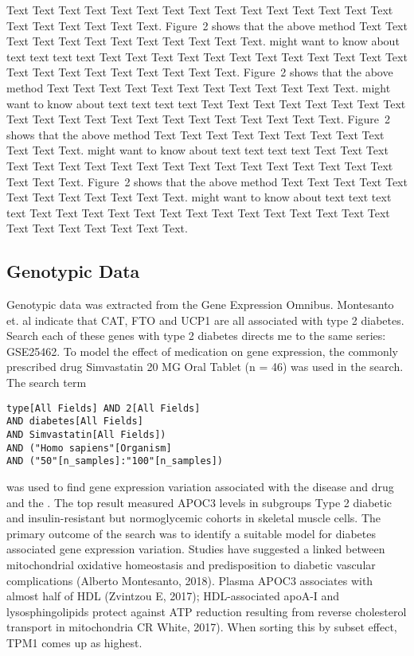 \documentclass{bioinfo}
\begin{document}
\begin{methods}
Text Text Text Text Text Text  Text Text Text Text Text Text Text
Text Text  Text Text Text Text Text Text.
Figure~2\vphantom{\ref{fig:02}} shows that the above method  Text
Text Text Text  Text Text Text Text Text Text  Text Text.
\citealp{Boffelli03} might want to know about  text text text text
Text Text Text Text Text Text Text Text Text Text Text Text Text
Text Text Text Text Text Text Text Text.
Figure~2\vphantom{\ref{fig:02}} shows that the above method  Text
Text Text Text Text Text Text Text Text Text  Text Text.
\citealp{Boffelli03} might want to know about text text text text
Text Text Text Text Text Text  Text Text Text Text Text Text Text
Text Text Text Text Text Text Text Text.
Figure~2\vphantom{\ref{fig:02}} shows that the above method  Text
Text Text Text Text Text Text Text Text Text  Text Text.
\citealp{Boffelli03} might want to know about text text text text
Text Text Text Text Text Text  Text Text Text Text Text Text Text
Text Text Text Text Text Text Text Text.
Figure~2\vphantom{\ref{fig:02}} shows that the above method Text
Text Text Text Text Text Text Text Text Text Text Text.
\citealp{Boffelli03} might want to know about text text text text
Text Text Text Text Text Text  Text Text Text Text Text Text Text
Text Text Text Text Text Text Text Text.
\subsection{Genotypic Data}

Genotypic data was extracted from the Gene Expression Omnibus. Montesanto et. al indicate that CAT, FTO and UCP1 are all associated with type 2 diabetes. Search each of these genes with type 2 diabetes directs me to the same series: GSE25462. To model the effect of medication on gene expression, the commonly prescribed drug Simvastatin 20 MG Oral Tablet (n = 46) was used in the search. The search term 


\begin{verbatim}
type[All Fields] AND 2[All Fields] 
AND diabetes[All Fields] 
AND Simvastatin[All Fields])
AND ("Homo sapiens"[Organism] 
AND ("50"[n_samples]:"100"[n_samples])

\end{verbatim}

was used to find gene expression variation associated with the disease and drug and the . The top result measured APOC3 levels in subgroups Type 2 diabetic and insulin-resistant but normoglycemic cohorts in skeletal muscle cells. The primary outcome of the search was to identify a suitable model for diabetes associated gene expression variation. Studies have suggested a linked between mitochondrial oxidative homeostasis and predisposition to diabetic vascular complications (Alberto Montesanto, 2018). Plasma APOC3 associates with almost half of HDL (Zvintzou E, 2017); HDL-associated apoA-I and lysosphingolipids protect against ATP reduction resulting from reverse cholesterol transport in mitochondria CR White, 2017). When sorting this by subset effect, TPM1 comes up as highest. 


\end{methods}
\end{document}
